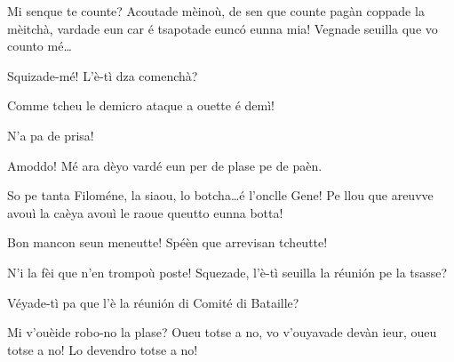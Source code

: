 \begin{drama}
\Maganspeaks{} Mi senque te counte?  Acoutade mèinoù, de sen que counte pagàn coppade la mèitchà, vardade eun car é tsapotade euncó eunna mia! Vegnade seuilla  que vo counto mé\ldots






\Mammaspeaks{} Squizade-mé! L'è-tì dza comenchà? 

\Spectateurspeaks Comme tcheu le demicro ataque a ouette é demì!

\Vetchotspeaks  N'a pa de prisa!

\Mammaspeaks Amoddo! Mé ara dèyo vardé eun per de plase pe de paèn.


\Mammaspeaks So pe tanta Filoméne, la siaou, lo botcha\ldots é l'onclle Gene!  Pe llou  que areuvve avouì la caèya avouì le raoue queutto eunna botta! 


\Mammaspeaks  Bon mancon seun meneutte! Spéèn que arrevisan tcheutte!


\TsachaouIspeaks{} N'i la fèi que n'en trompoù poste!  Squezade, l'è-tì seuilla la réuni\'on pe la tsasse? 

\Vetchotspeaks Véyade-tì pa que l'è la réuni\'on di Comité di Bataille?

\TsachaouIIspeaks Mi v'ouèide robo-no la plase? Oueu totse a no, vo v'ouyavade devàn ieur, oueu totse a no! Lo devendro totse a no!


\end{drama}
